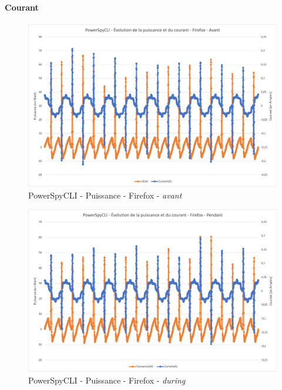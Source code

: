 \documentclass[12pt, a4paper]{report}
\begin{document}
\paragraph{
\textbf{Courant}}
\begin{figure}[H]
    \includegraphics[width=1\linewidth]{res//graph/PowerSpyCLI/Puissance_ff_avant.png}
    \caption{PowerSpyCLI - Puissance - Firefox - \textit{avant}}
    \label{fig:pscli_power_ff_after}
\end{figure}
\begin{figure}[H]
    \includegraphics[width=1\linewidth]{res//graph/PowerSpyCLI/Puissance_ff_pendant.png}
    \caption{PowerSpyCLI - Puissance - Firefox - \textit{during}}
    \label{fig:pscli_power_ff_after}
\end{figure}
\end{document}
